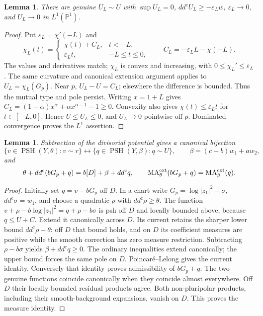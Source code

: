 \documentclass[11pt]{article}
\newtheorem{lemma}[theorem]{Lemma}
\theoremstyle{remark}
\newcommand{\ddc}{dd^{\mathrm c}}
\newcommand{\PSH}{\operatorname{PSH}}
\newcommand{\MA}{\operatorname{MA}}
\newcommand{\PP}{\mathbb P}
\begin{document}
\begin{lemma}\label{lem:small}
There are genuine $U_L\sim U$ with $\sup U_L=0$,
$\ddc U_L\geq-\varepsilon_Lw$, $\varepsilon_L\to0$, and $U_L\to0$
in $L^1(\PP^1)$.
\end{lemma}
\begin{proof}
Put $\varepsilon_L=\chi'(-L)$ and
\[
 \chi_L(t)=
 \begin{cases}
  \chi(t)+C_L,&t<-L,\\
  \varepsilon_Lt,&-L\leq t\leq0,
 \end{cases}
 \qquad C_L=-\varepsilon_LL-\chi(-L).
\]
The values and derivatives match; $\chi_L$ is convex and increasing,
with $0\leq\chi_L'\leq\varepsilon_L$. The same curvature and canonical
extension argument applies to $U_L=\chi_L(G_p)$. Near $p$, $U_L-U=C_L$;
elsewhere the difference is bounded. Thus the mutual type and pole persist.
Writing $x=1+L$ gives
$C_L=(1-\alpha)x^\alpha+\alpha x^{\alpha-1}-1\geq0$.
Convexity also gives $\chi(t)\leq\varepsilon_Lt$ for $t\in[-L,0]$.
Hence $U\leq U_L\leq0$, and $U_L\to0$ pointwise off $p$.
Dominated convergence proves the $L^1$ assertion.
\end{proof}

\begin{lemma}\label{lem:remove}
Subtraction of the divisorial potential gives a canonical bijection
\[
 \{v\in\PSH(Y,\theta):v\sim r\}
 \longleftrightarrow
 \{q\in\PSH(Y,\beta):q\sim U\},\qquad
 \beta=(c-b)w_1+aw_2,
\]
and
\[
 \theta+\ddc(bG_p+q)=b[D]+\beta+\ddc q,
 \qquad \MA^{\rm ext}_\theta(bG_p+q)=\MA^{\rm ext}_\beta(q).
\]
\end{lemma}
\begin{proof}
Initially set $q=v-bG_p$ off $D$. In a chart write
$G_p=\log|z_1|^2-\sigma$, $\ddc\sigma=w_1$, and choose a quadratic
$\rho$ with $\ddc\rho\geq\theta$. The function
$v+\rho-b\log|z_1|^2=q+\rho-b\sigma$ is psh off $D$ and locally
bounded above, because $q\leq U+C$. Extend it canonically across $D$.
Its current retains the sharper lower bound $\ddc\rho-\theta$:
off $D$ that bound holds, and on $D$ its coefficient measures are positive
while the smooth correction has zero measure restriction. Subtracting
$\rho-b\sigma$ yields $\beta+\ddc q\geq0$.
The ordinary inequalities extend canonically; the upper bound forces the
same pole on $D$. Poincar\'e--Lelong gives the current identity. Conversely
that identity proves admissibility of $bG_p+q$. The two genuine functions
coincide canonically when they coincide almost everywhere.
Off $D$ their locally bounded residual products agree. Both non-pluripolar
products, including their smooth-background expansions, vanish on $D$.
This proves the measure identity.
\end{proof}
\end{document}
